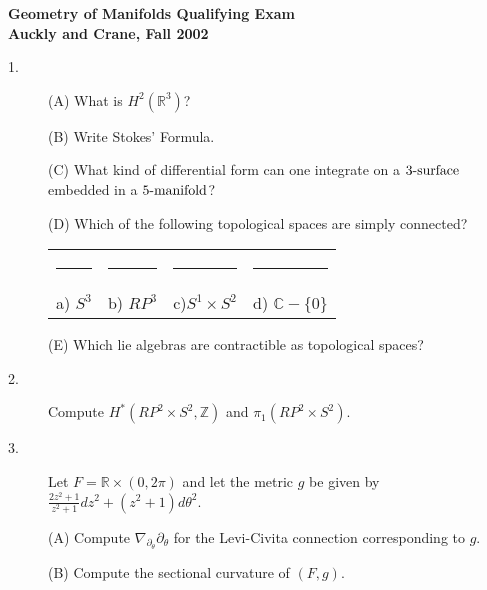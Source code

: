 \documentclass[12pt]{article}
\def\ds{\displaystyle}
\def\R{{\mathbb R}}
\def\Z{{\mathbb Z}}
\def\C{{\mathbb C}}
\def\ds{\displaystyle}
\begin{document}
\begin{large}

\begin{center}
{\bf
Geometry of Manifolds Qualifying Exam\\
Auckly and Crane, Fall 2002
}\end{center}

\vspace{.15in}


\begin{description}

\item[1.] (A)
What is $H^2(\R^3)$?

\vspace{.15in}
\item[\quad] (B)
Write Stokes' Formula.

\vspace{.15in}
\item[\quad] (C)
What kind of differential form can one integrate on a $3\hbox{-surface}$
embedded in a $5\hbox{-manifold}$?

\vspace{.15in}
\item[\quad] (D)
Which of the following topological spaces are simply connected?

\begin{tabular}{llll}
\rule{1.15in}{0in}&\rule{1.15in}{0in}&\rule{1.15in}{0in}&\rule{1.15in}{0in}\\
a) $S^3$  & b) $RP^3$ & c)$S^1\times S^2$ & d) $\C-\{0\}$
\end{tabular}

\vspace{.15in}
\item[\quad] (E)
Which lie algebras are contractible as topological spaces?

\vspace{.15in}
\item[2.]
Compute $H^\ast(RP^2\times S^2, \Z)$ and $\pi_1(RP^2\times S^2)$.

\vspace{.15in}
\item[3.]
Let $F=\R\times (0,2\pi)$ and let the metric $g$ be given by
$\ds\frac{2z^2+1}{z^2+1}dz^2+(z^2+1)d\theta^2$.

\vspace{.15in}
\item[\quad] (A)
Compute $\nabla_{\partial_\theta}\partial_\theta$ for the Levi-Civita
connection corresponding to $g$.

\vspace{.15in}
\item[\quad] (B)
Compute the sectional curvature of $(F,g)$.


\end{description}
\end{large}
\end{document}
